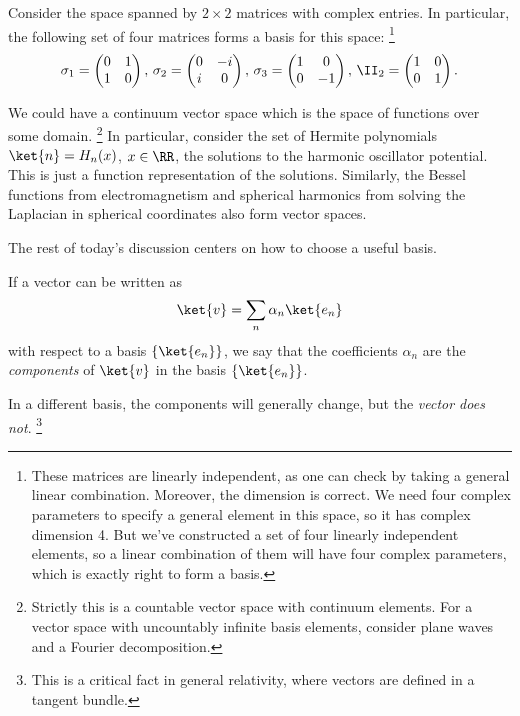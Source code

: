 \begin{exm}
    Consider the space spanned by $2\times 2$ matrices with complex entries. In particular, the following set of four matrices forms a basis for this space:%
        \footnote{These matrices are linearly independent, as one can check by taking a general linear combination. Moreover, the dimension is correct. We need four complex parameters to specify a general element in this space, so it has complex dimension 4. But we've constructed a set of four linearly independent elements, so a linear combination of them will have four complex parameters, which is exactly right to form a basis.}
    \begin{equation}
        \sigma_1 =\begin{pmatrix}
            0 & 1\\
            1 & 0
        \end{pmatrix},\,
        \sigma_2= \begin{pmatrix}
            0 & -i\\
            i & 0
        \end{pmatrix},\,
        \sigma_3= \begin{pmatrix}
            1 & 0\\
            0 & -1
        \end{pmatrix},\,
        \II_2=\begin{pmatrix}
            1 & 0\\
            0 & 1
        \end{pmatrix}.
    \end{equation}
\end{exm}
\begin{exm}
    We could have a continuum vector space which is the space of functions over some domain.%
        \footnote{Strictly this is a countable vector space with continuum elements. For a vector space with uncountably infinite basis elements, consider plane waves and a Fourier decomposition.}
    In particular, consider the set of Hermite polynomials $\ket{n}=H_n(x)$, $x\in \RR$, the solutions to the harmonic oscillator potential. This is just a function representation of the solutions. Similarly, the Bessel functions from electromagnetism and spherical harmonics from solving the Laplacian in spherical coordinates also form vector spaces.
\end{exm}

The rest of today's discussion centers on how to choose a useful basis.

\begin{defn}
    If a vector can be written as
    \begin{equation}
        \ket{v}=\sum_n \alpha_n \ket{e_n}
    \end{equation}
    with respect to a basis $\set{\ket{e_n}}$, we say that the coefficients $\alpha_n$ are the \emph{components} of $\ket{v}$ in the basis $\set{\ket{e_n}}$.
\end{defn}
In a different basis, the components will generally change, but the \emph{vector does not}.%
    \footnote{This is a critical fact in general relativity, where vectors are defined in a tangent bundle.}

